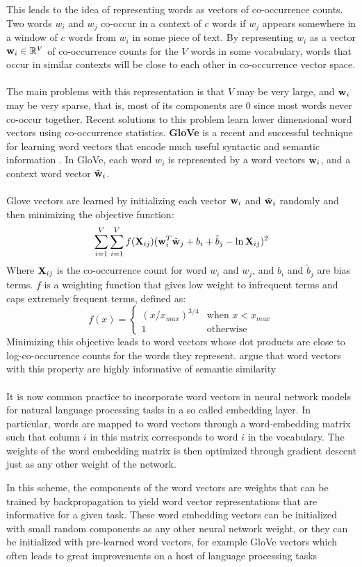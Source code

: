 This leads to the idea of representing words as vectors of co-occurrence counts. Two words $w_i$ and $w_j$ co-occur in a context of $c$ words if $w_j$ appears somewhere in a window of $c$ words from $w_i$ in some piece of text. By representing $w_i$ as a vector $\mathbf{w}_i \in \mathbb{R}^V$ of co-occurrence counts for the $V$ words in some vocabulary, words that occur in similar contexts will be close to each other in co-occurrence vector space.
\\\\
The main problems with this representation is that $V$ may be very large, and $\mathbf{w}_i$ may be very sparse, that is, most of its components are 0 since most words never co-occur together. Recent solutions to this problem learn lower dimensional word vectors using co-occurrence statistics. \textbf{GloVe} is a recent and successful technique for learning word vectors that encode much useful syntactic and semantic information \citep{pennington2014}. In GloVe, each word $w_i$ is represented by a word vectors $\mathbf{w}_i$, and a context word vector $\tilde{\mathbf{w}}_i$.
\\\\
Glove vectors are learned by initializing each vector $\mathbf{w}_i$ and $\tilde{\mathbf{w}}_i$ randomly and then minimizing the objective function:
$$
\sum\limits_{i=1}^V\sum\limits_{i=1}^V f(\mathbf{X}_{ij})(\mathbf{w}_i^T\tilde{\mathbf{w}}_j + b_i + \tilde{b}_j - \ln \mathbf{X}_{ij})^2
$$
Where $\mathbf{X}_{ij}$ is the co-occurrence count for word $w_i$ and $w_j$, and $b_i$ and $\tilde{b}_j$ are bias terms. $f$ is a weighting function that gives low weight to infrequent terms and caps extremely frequent terms, defined as:
$$
f(x) = \begin{cases}
	(x / x_{max})^{3/4} & \text{when $x < x_{max}$} \\
	1 & \text{otherwise}
\end{cases}
$$
Minimizing this objective leads to word vectors whose dot products are close to log-co-occurrence counts for the words they represent. \citet{pennington2014} argue that word vectors with this property are highly informative of semantic similarity
\\\\
It is now common practice to incorporate word vectors in neural network models for natural language processing tasks in a so called embedding layer. In particular, words are mapped to word vectors through a word-embedding matrix such that column $i$ in this matrix corresponds to word $i$ in the vocabulary. The weights of the word embedding matrix is then optimized through gradient descent just as any other weight of the network. 

In this scheme, the components of the word vectors are weights that can be trained by backpropagation to yield word vector representations that are informative for a given task. These word embedding vectors can be initialized with small random components as any other neural network weight, or they can be initialized with pre-learned word vectors, for example GloVe vectors which often leads to great improvements on a host of language processing tasks \citep{collobert2008, collobert2011, nguyen2015, kim2014, zhang2015}
